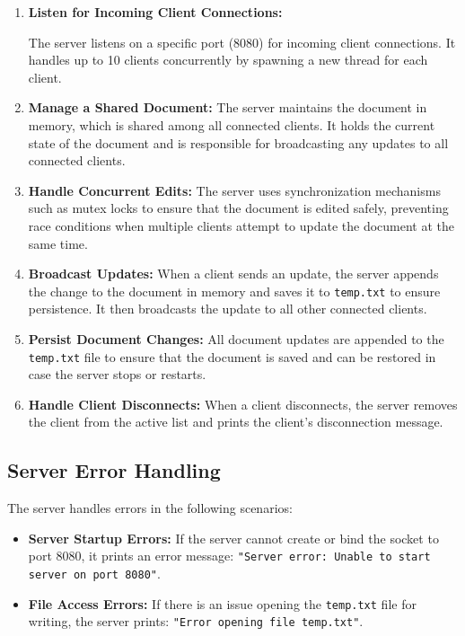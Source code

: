 \documentclass{exam}
\begin{document}
\begin{enumerate}
    \item \textbf{Listen for Incoming Client Connections:} 
    
    
    The server listens on a specific port (8080) for incoming client connections. It handles up to 10 clients concurrently by spawning a new thread for each client.
    \item \textbf{Manage a Shared Document:} The server maintains the document in memory, which is shared among all connected clients. It holds the current state of the document and is responsible for broadcasting any updates to all connected clients.
    \item \textbf{Handle Concurrent Edits:} The server uses synchronization mechanisms such as mutex locks to ensure that the document is edited safely, preventing race conditions when multiple clients attempt to update the document at the same time.
    \item \textbf{Broadcast Updates:} When a client sends an update, the server appends the change to the document in memory and saves it to \texttt{temp.txt} to ensure persistence. It then broadcasts the update to all other connected clients.
    \item \textbf{Persist Document Changes:} All document updates are appended to the \texttt{temp.txt} file to ensure that the document is saved and can be restored in case the server stops or restarts.
    \item \textbf{Handle Client Disconnects:} When a client disconnects, the server removes the client from the active list and prints the client's disconnection message.
\end{enumerate}

\subsection*{Server Error Handling}
The server handles errors in the following scenarios:
\begin{itemize}
    \item \textbf{Server Startup Errors:} If the server cannot create or bind the socket to port 8080, it prints an error message: \texttt{"Server error: Unable to start server on port 8080"}.
    \item \textbf{File Access Errors:} If there is an issue opening the \texttt{temp.txt} file for writing, the server prints: \texttt{"Error opening file temp.txt"}.
\end{itemize}
\end{document}
